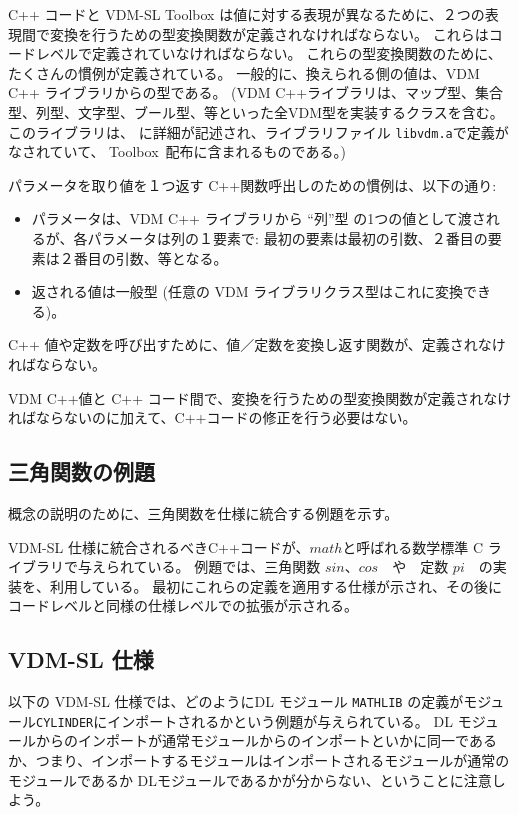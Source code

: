 \documentclass[\pformat,12pt]{jarticle}
\newcommand{\Toolbox}{Toolbox}
\begin{document}
 C++ コードと VDM-SL Toolbox は値に対する表現が異なるために、２つの表現間で変換を行うための型変換関数が定義されなければならない。
これらはコードレベルで定義されていなければならない。
これらの型変換関数のために、たくさんの慣例が定義されている。 
一般的に、換えられる側の値は、VDM C++ ライブラリからの型である。
(VDM C++ライブラリは、マップ型、集合型、列型、文字型、ブール型、等といった全VDM型を実装するクラスを含む。
このライブラリは、 \cite{LibMan-CSK}に詳細が記述され、ライブラリファイル {\tt libvdm.a}で定義がなされていて、 \Toolbox\ 配布に含まれるものである。)

パラメータを取り値を１つ返す C++関数呼出しのための慣例は、以下の通り:
\begin{itemize}
\item パラメータは、VDM C++ ライブラリから ``列''型 の1つの値として渡されるが、各パラメータは列の１要素で: 最初の要素は最初の引数、２番目の要素は２番目の引数、等となる。
\item 返される値は一般型 (任意の VDM ライブラリクラス型はこれに変換できる)。
\end{itemize}

 C++ 値や定数を呼び出すために、値／定数を変換し返す関数が、定義されなければならない。

VDM C++値と C++ コード間で、変換を行うための型変換関数が定義されなければならないのに加えて、C++コードの修正を行う必要はない。

 
\subsection{三角関数の例題}

概念の説明のために、三角関数を仕様に統合する例題を示す。

 VDM-SL 仕様に統合されるべきC++コードが、$math$と呼ばれる数学標準 C ライブラリで与えられている。
例題では、三角関数 $sin$、$cos$　や　定数 $pi$　の実装を、利用している。
最初にこれらの定義を適用する仕様が示され、その後にコードレベルと同様の仕様レベルでの拡張が示される。

\subsection*{VDM-SL 仕様}

以下の VDM-SL 仕様では、どのようにDL モジュール {\tt MATHLIB} の定義がモジュール{\tt CYLINDER}にインポートされるかという例題が与えられている。
DL モジュールからのインポートが通常モジュールからのインポートといかに同一であるか、つまり、インポートするモジュールはインポートされるモジュールが通常のモジュールであるか DLモジュールであるかが分からない、ということに注意しよう。
\end{document}

